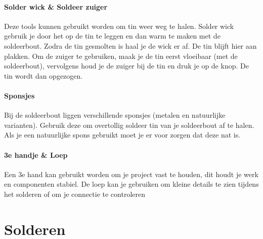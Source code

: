 \documentclass{guide}
\begin{document}
\paragraph{Solder wick \& Soldeer zuiger}
Deze tools kunnen gebruikt worden om tin weer weg te halen. Solder wick gebruik je door het op de tin te leggen en dan warm te maken met de soldeerbout. Zodra de tin gesmolten is haal je de wick er af. De tin blijft hier aan plakken. Om de zuiger te gebruiken, maak je de tin eerst vloeibaar (met de soldeerbout), vervolgens houd je de zuiger bij de tin en druk je op de knop. De tin wordt dan opgezogen.

\paragraph{Sponsjes}
Bij de soldeerbout liggen verschillende sponsjes (metalen en natuurlijke varianten). Gebruik deze om overtollig soldeer tin van je soldeerbout af te halen. Als je een natuurlijke spons gebruikt moet je er voor zorgen dat deze nat is.

\paragraph{3e handje \& Loep}
Een 3e hand kan gebruikt worden om je project vast te houden, dit houdt je werk en componenten stabiel. De loep kan je gebruiken om kleine details te zien tijdens het solderen of om je connectie te controleren

\section{Solderen}
\end{document}
